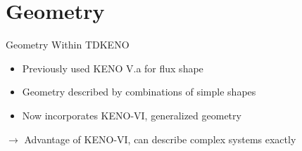 \section{Geometry}

\begin{frame}{Geometry Within TDKENO}

\begin{itemize}
    \item Previously used KENO V.a for flux shape
    \item Geometry described by combinations of simple shapes
    \item Now incorporates KENO-VI, generalized geometry
\end{itemize}
    $\rightarrow$ Advantage of KENO-VI, can describe complex systems exactly 

\end{frame}